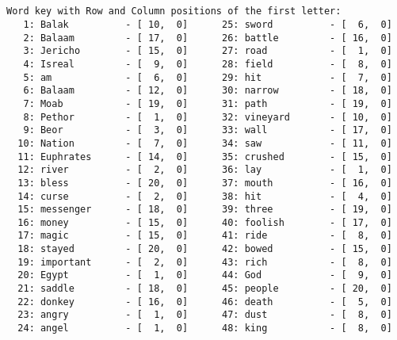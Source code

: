 \documentclass[12pt,a4paper,article]{memoir}\usepackage[]{graphicx}\usepackage[]{color}
\begin{document}
\clearpage
\normalsize
\begin{verbatim}


Word key with Row and Column positions of the first letter:
   1: Balak          - [ 10,  0]      25: sword          - [  6,  0]
   2: Balaam         - [ 17,  0]      26: battle         - [ 16,  0]
   3: Jericho        - [ 15,  0]      27: road           - [  1,  0]
   4: Isreal         - [  9,  0]      28: field          - [  8,  0]
   5: am             - [  6,  0]      29: hit            - [  7,  0]
   6: Balaam         - [ 12,  0]      30: narrow         - [ 18,  0]
   7: Moab           - [ 19,  0]      31: path           - [ 19,  0]
   8: Pethor         - [  1,  0]      32: vineyard       - [ 10,  0]
   9: Beor           - [  3,  0]      33: wall           - [ 17,  0]
  10: Nation         - [  7,  0]      34: saw            - [ 11,  0]
  11: Euphrates      - [ 14,  0]      35: crushed        - [ 15,  0]
  12: river          - [  2,  0]      36: lay            - [  1,  0]
  13: bless          - [ 20,  0]      37: mouth          - [ 16,  0]
  14: curse          - [  2,  0]      38: hit            - [  4,  0]
  15: messenger      - [ 18,  0]      39: three          - [ 19,  0]
  16: money          - [ 15,  0]      40: foolish        - [ 17,  0]
  17: magic          - [ 15,  0]      41: ride           - [  8,  0]
  18: stayed         - [ 20,  0]      42: bowed          - [ 15,  0]
  19: important      - [  2,  0]      43: rich           - [  8,  0]
  20: Egypt          - [  1,  0]      44: God            - [  9,  0]
  21: saddle         - [ 18,  0]      45: people         - [ 20,  0]
  22: donkey         - [ 16,  0]      46: death          - [  5,  0]
  23: angry          - [  1,  0]      47: dust           - [  8,  0]
  24: angel          - [  1,  0]      48: king           - [  8,  0]

\end{verbatim}
\clearpage
\end{document}
